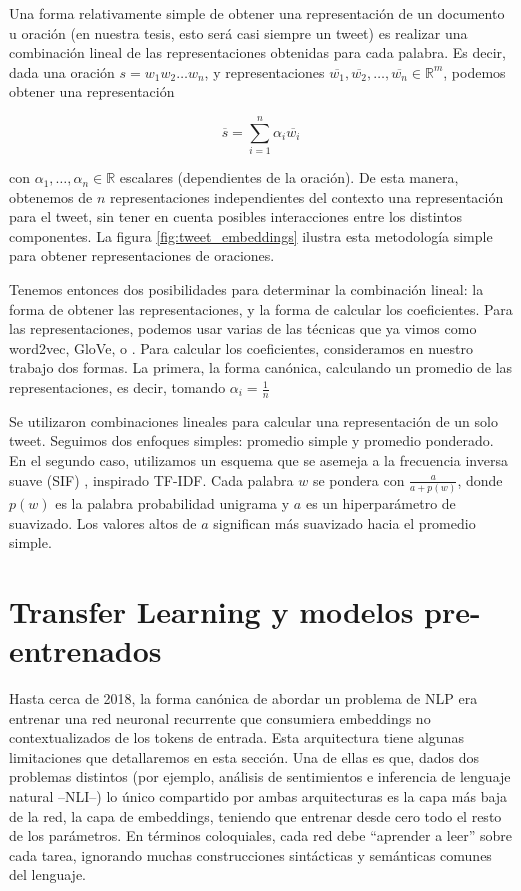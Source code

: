Una forma relativamente simple de obtener una representación de un documento u oración (en nuestra tesis, esto será casi siempre un tweet) es realizar una combinación lineal de las representaciones obtenidas para cada palabra. Es decir, dada una oración $s = w_1 w_2 \ldots w_n$, y representaciones $\overline{w_1}, \overline{w_2}, \ldots, \overline{w_n} \in \mathbb{R}^m$, podemos obtener una representación

\begin{equation}
    \overline{s} = \sum\limits_{i=1}^{n} \alpha_i \overline{w_i}
\end{equation}

con $\alpha_1, \ldots, \alpha_n \in \mathbb{R}$ escalares (dependientes de la oración). De esta manera, obtenemos de $n$ representaciones independientes del contexto una representación para el tweet, sin tener en cuenta posibles interacciones entre los distintos componentes. La figura \ref{fig:tweet_embeddings} ilustra esta metodología simple para obtener representaciones de oraciones.

Tenemos entonces dos posibilidades para determinar la combinación lineal: la forma de obtener las representaciones, y la forma de calcular los coeficientes. Para las representaciones, podemos usar varias de las técnicas que ya vimos como word2vec, GloVe, o \fasttext{}. Para calcular los coeficientes, consideramos en nuestro trabajo dos formas. La primera, la forma canónica, calculando un promedio de las representaciones, es decir, tomando $\alpha_i = \frac{1}{n}$

Se utilizaron combinaciones lineales para calcular una representación de un solo tweet.
Seguimos dos enfoques simples: promedio simple y promedio ponderado. En el segundo caso, utilizamos un esquema que se asemeja a la frecuencia inversa suave (SIF) \cite{arora17}, inspirado TF-IDF.
Cada palabra $ w $ se pondera con $ \frac {a} {a + p (w)} $, donde $ p (w) $ es la palabra probabilidad unigrama y $ a $ es un hiperparámetro de suavizado.
Los valores altos de $ a $ significan más suavizado hacia el promedio simple.



\section{Transfer Learning y modelos pre-entrenados}
\label{subsec:elmo}


Hasta cerca de 2018, la forma canónica de abordar un problema de NLP era entrenar una red neuronal recurrente que consumiera embeddings no contextualizados de los tokens de entrada. Esta arquitectura tiene algunas limitaciones que detallaremos en esta sección. Una de ellas es que, dados dos problemas distintos (por ejemplo, análisis de sentimientos e inferencia de lenguaje natural --NLI--) lo único compartido por ambas arquitecturas es la capa más baja de la red, la capa de embeddings, teniendo que entrenar desde cero todo el resto de los parámetros. En términos coloquiales, cada red debe ``aprender a leer'' sobre cada tarea, ignorando muchas construcciones sintácticas y semánticas comunes del lenguaje.

